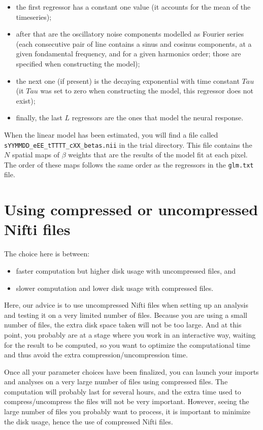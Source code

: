 \begin{itemize}
  \item the first regressor has a constant one value (it accounts for the mean of the timeseries);
  \item after that are the oscillatory noise components modelled as Fourier series (each consecutive pair of line contains a sinus and cosinus components, at a given fondamental frequency, and for a given harmonics order; those are specified when constructing the model);
  \item the next one (if present) is the decaying exponential with time constant $Tau$ (it $Tau$ was set to zero when constructing the model, this regressor does not exist);
  \item finally, the last $L$ regressors are the ones that model the neural response.
\end{itemize}

When the linear model has been estimated, you will find a file called \texttt{sYYMMDD\_eEE\_tTTTT\_cXX\_betas.nii} in the trial directory. This file contains the $N$ spatial maps of $\beta$ weights that are the results of the model fit at each pixel. The order of these maps follows the same order as the regressors in the \texttt{glm.txt} file.

\section{Using compressed or uncompressed Nifti files}

The choice here is between:
\begin{itemize}
  \item faster computation but higher disk usage with uncompressed files, and
  \item slower computation and lower disk usage with compressed files.
\end{itemize}


Here, our advice is to use uncompressed Nifti files when setting up an analysis and testing it on a very limited number of files. Because you are using a small number of files, the extra disk space taken will not be too large. And at this point, you probably are at a stage where you work in an interactive way, waiting for the result to be computed, so you want to optimize the computational time and thus avoid the extra compression/uncompression time.

Once all your parameter choices have been finalized, you can launch your imports and analyses on a very large number of files using compressed files. The computation will probably last for several hours, and the extra time used to compress/uncompress the files will not be very important. However, seeing the large number of files you probably want to process, it is important to minimize the disk usage, hence the use of compressed Nifti files.

